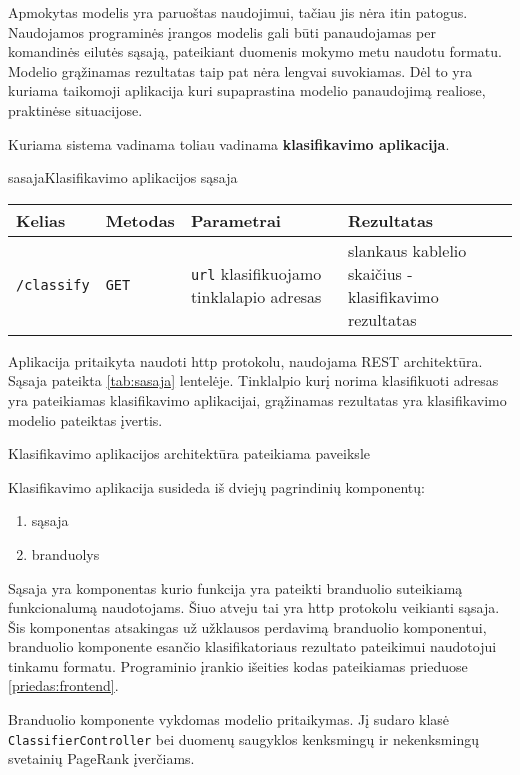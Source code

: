 
Apmokytas modelis yra paruoštas naudojimui, tačiau jis nėra itin patogus. Naudojamos programinės įrangos modelis gali
būti panaudojamas per komandinės eilutės sąsają, pateikiant duomenis mokymo metu naudotu formatu. Modelio grąžinamas
rezultatas taip pat nėra lengvai suvokiamas. Dėl to yra kuriama taikomoji aplikacija kuri supaprastina modelio
panaudojimą realiose, praktinėse situacijose.

Kuriama sistema vadinama toliau vadinama \textbf{klasifikavimo aplikacija}.

\begin{ktutable}{sasaja}{Klasifikavimo aplikacijos sąsaja}
    \begin{tabular}{|l|l|p{5cm}|p{5cm}|}
    \hline
        Kelias & Metodas & Parametrai & Rezultatas \\ \hline
        \texttt{/classify} & \texttt{GET} & \texttt{url} klasifikuojamo tinklalapio adresas & slankaus kablelio skaičius - klasifikavimo rezultatas \\ \hline
    \end{tabular}
\end{ktutable}

Aplikacija pritaikyta naudoti http protokolu, naudojama REST architektūra. Sąsaja pateikta \vref{tab:sasaja}
lentelėje. Tinklalpio kurį norima klasifikuoti adresas yra pateikiamas klasifikavimo aplikacijai, grąžinamas
rezultatas yra klasifikavimo modelio pateiktas įvertis.

Klasifikavimo aplikacijos architektūra pateikiama paveiksle 


Klasifikavimo aplikacija susideda iš dviejų pagrindinių komponentų:
\begin{enumerate}
\item sąsaja
\item branduolys
\end{enumerate}
Sąsaja yra komponentas kurio funkcija yra pateikti branduolio suteikiamą funkcionalumą naudotojams. Šiuo atveju
tai yra http protokolu veikianti sąsaja. Šis komponentas atsakingas už užklausos perdavimą branduolio komponentui,
branduolio komponente esančio klasifikatoriaus rezultato pateikimui naudotojui tinkamu formatu. Programinio
įrankio išeities kodas pateikiamas prieduose \vref{priedas:frontend}.

Branduolio komponente vykdomas modelio pritaikymas. Jį sudaro klasė \texttt{ClassifierController} bei duomenų
saugyklos kenksmingų ir nekenksmingų svetainių PageRank įverčiams.

